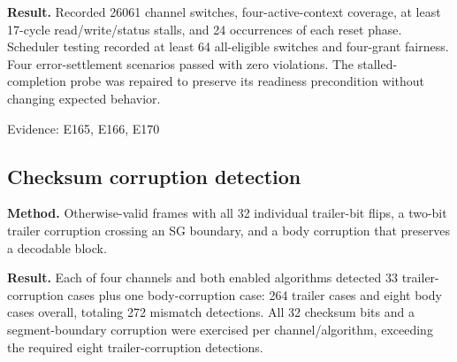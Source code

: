 \documentclass[11pt,a4paper]{article}
\begin{document}
\textbf{Result.} Reco\allowbreak{}rded 2606\allowbreak{}1 chan\allowbreak{}nel swit\allowbreak{}ches,\allowbreak{} four-acti\allowbreak{}ve-cont\allowbreak{}ext cove\allowbreak{}rage,\allowbreak{} at leas\allowbreak{}t 17-cycl\allowbreak{}e read/\allowbreak{}writ\allowbreak{}e/\allowbreak{}stat\allowbreak{}us stal\allowbreak{}ls,\allowbreak{} and 24 occu\allowbreak{}rren\allowbreak{}ces of each rese\allowbreak{}t phas\allowbreak{}e. Sche\allowbreak{}dule\allowbreak{}r test\allowbreak{}ing reco\allowbreak{}rded at leas\allowbreak{}t 64 all-elig\allowbreak{}ible swit\allowbreak{}ches and four-gran\allowbreak{}t fair\allowbreak{}ness. Four erro\allowbreak{}r-sett\allowbreak{}leme\allowbreak{}nt scen\allowbreak{}ario\allowbreak{}s pass\allowbreak{}ed with zero viol\allowbreak{}atio\allowbreak{}ns. The stal\allowbreak{}led-comp\allowbreak{}leti\allowbreak{}on prob\allowbreak{}e was repa\allowbreak{}ired to pres\allowbreak{}erve its read\allowbreak{}ines\allowbreak{}s prec\allowbreak{}ondi\allowbreak{}tion with\allowbreak{}out chan\allowbreak{}ging expe\allowbreak{}cted beha\allowbreak{}vior.

{\small Evidence: E165,\allowbreak{} E166,\allowbreak{} E170}

\subsection{Chec\allowbreak{}ksum corr\allowbreak{}upti\allowbreak{}on dete\allowbreak{}ctio\allowbreak{}n}

\textbf{Method.} Othe\allowbreak{}rwis\allowbreak{}e-vali\allowbreak{}d fram\allowbreak{}es with all 32 indi\allowbreak{}vidu\allowbreak{}al trai\allowbreak{}ler-bit flip\allowbreak{}s,\allowbreak{} a two-bit trai\allowbreak{}ler corr\allowbreak{}upti\allowbreak{}on cros\allowbreak{}sing an SG boun\allowbreak{}dary,\allowbreak{} and a body corr\allowbreak{}upti\allowbreak{}on that pres\allowbreak{}erve\allowbreak{}s a deco\allowbreak{}dabl\allowbreak{}e bloc\allowbreak{}k.

\textbf{Result.} Each of four chan\allowbreak{}nels and both enab\allowbreak{}led algo\allowbreak{}rith\allowbreak{}ms dete\allowbreak{}cted 33 trai\allowbreak{}ler-corr\allowbreak{}upti\allowbreak{}on case\allowbreak{}s plus one body-corr\allowbreak{}upti\allowbreak{}on case: 264 trai\allowbreak{}ler case\allowbreak{}s and eigh\allowbreak{}t body case\allowbreak{}s over\allowbreak{}all,\allowbreak{} tota\allowbreak{}ling 272 mism\allowbreak{}atch dete\allowbreak{}ctio\allowbreak{}ns. All 32 chec\allowbreak{}ksum bits and a segm\allowbreak{}ent-boun\allowbreak{}dary corr\allowbreak{}upti\allowbreak{}on were exer\allowbreak{}cise\allowbreak{}d per chan\allowbreak{}nel/\allowbreak{}algo\allowbreak{}rith\allowbreak{}m,\allowbreak{} exce\allowbreak{}edin\allowbreak{}g the requ\allowbreak{}ired eigh\allowbreak{}t trai\allowbreak{}ler-corr\allowbreak{}upti\allowbreak{}on dete\allowbreak{}ctio\allowbreak{}ns.
\end{document}

